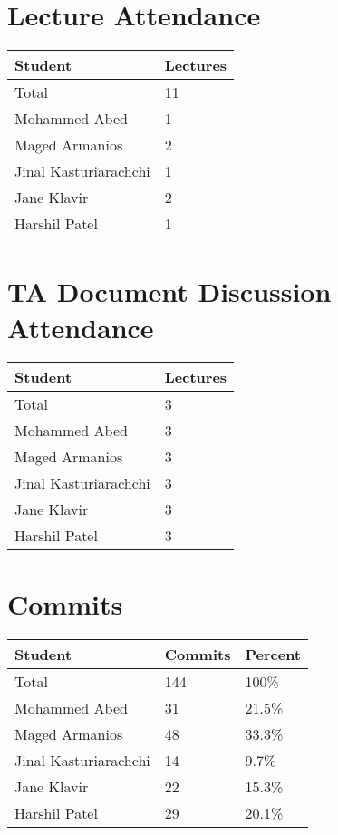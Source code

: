 \documentclass{article}
\begin{document}
\section{Lecture Attendance}

\begin{table}[H]
\centering
\begin{tabular}{ll}
\toprule
\textbf{Student} & \textbf{Lectures}\\
\midrule
Total & 11\\
Mohammed Abed & 1\\
Maged Armanios & 2\\
Jinal Kasturiarachchi & 1\\
Jane Klavir & 2\\
Harshil Patel & 1\\
\bottomrule
\end{tabular}
\end{table}


\section{TA Document Discussion Attendance}

\begin{table}[H]
\centering
\begin{tabular}{ll}
\toprule
\textbf{Student} & \textbf{Lectures}\\
\midrule
Total & 3\\
Mohammed Abed & 3\\
Maged Armanios & 3\\
Jinal Kasturiarachchi & 3\\
Jane Klavir & 3\\
Harshil Patel & 3\\
\bottomrule
\end{tabular}
\end{table}


\section{Commits}

\begin{table}[H]
\centering
\begin{tabular}{lll}
\toprule
\textbf{Student} & \textbf{Commits} & \textbf{Percent}\\
\midrule
Total & 144 & 100\% \\
Mohammed Abed & 31 & 21.5\% \\
Maged Armanios & 48 & 33.3\% \\
Jinal Kasturiarachchi & 14 & 9.7\% \\
Jane Klavir & 22 & 15.3\% \\
Harshil Patel & 29 & 20.1\% \\
\bottomrule
\end{tabular}
\end{table}
\end{document}
